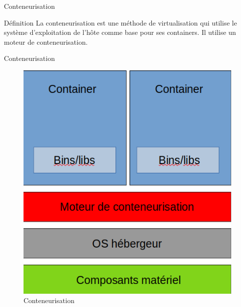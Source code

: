 \documentclass[11pt]{beamer}
\begin{document}
\begin{frame}{Conteneurisation}
\begin{block}{Définition}
La conteneurisation est une méthode de virtualisation qui utilise le système d'exploitation de l'hôte comme base pour ses containers. Il utilise un moteur de conteneurisation.
\end{block}

\end{frame}

\begin{frame}{Conteneurisation}
	\begin{figure}
		\includegraphics[scale=0.30]{images/container.png}
		\caption{Conteneurisation}
	\end{figure}
\end{frame}
\end{document}
